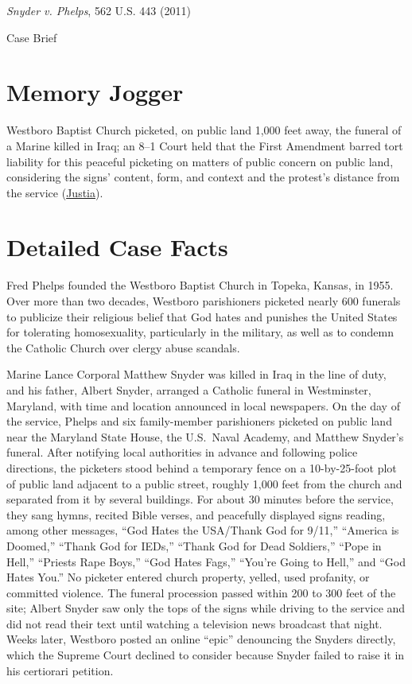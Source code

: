 \documentclass[12pt]{article}
\begin{document}
\begin{center}
{\LARGE \textit{Snyder v. Phelps}, 562 U.S. 443 (2011)\par}
\vspace{0.8em}
{\large Case Brief\par}
\end{center}
\vspace{1em}

\section{Memory Jogger}
Westboro Baptist Church picketed, on public land 1,000 feet away, the funeral of a Marine killed in Iraq; an 8--1 Court held that the First Amendment barred tort liability for this peaceful picketing on matters of public concern on public land, considering the signs' content, form, and context and the protest's distance from the service (\href{https://supreme.justia.com/cases/federal/us/562/443/}{Justia}).

\section{Detailed Case Facts}
Fred Phelps founded the Westboro Baptist Church in Topeka, Kansas, in 1955. Over more than two decades, Westboro parishioners picketed nearly 600 funerals to publicize their religious belief that God hates and punishes the United States for tolerating homosexuality, particularly in the military, as well as to condemn the Catholic Church over clergy abuse scandals.

Marine Lance Corporal Matthew Snyder was killed in Iraq in the line of duty, and his father, Albert Snyder, arranged a Catholic funeral in Westminster, Maryland, with time and location announced in local newspapers. On the day of the service, Phelps and six family-member parishioners picketed on public land near the Maryland State House, the U.S.\ Naval Academy, and Matthew Snyder's funeral. After notifying local authorities in advance and following police directions, the picketers stood behind a temporary fence on a 10-by-25-foot plot of public land adjacent to a public street, roughly 1,000 feet from the church and separated from it by several buildings. For about 30 minutes before the service, they sang hymns, recited Bible verses, and peacefully displayed signs reading, among other messages, ``God Hates the USA/Thank God for 9/11,'' ``America is Doomed,'' ``Thank God for IEDs,'' ``Thank God for Dead Soldiers,'' ``Pope in Hell,'' ``Priests Rape Boys,'' ``God Hates Fags,'' ``You're Going to Hell,'' and ``God Hates You.'' No picketer entered church property, yelled, used profanity, or committed violence. The funeral procession passed within 200 to 300 feet of the site; Albert Snyder saw only the tops of the signs while driving to the service and did not read their text until watching a television news broadcast that night. Weeks later, Westboro posted an online ``epic'' denouncing the Snyders directly, which the Supreme Court declined to consider because Snyder failed to raise it in his certiorari petition.
\end{document}
